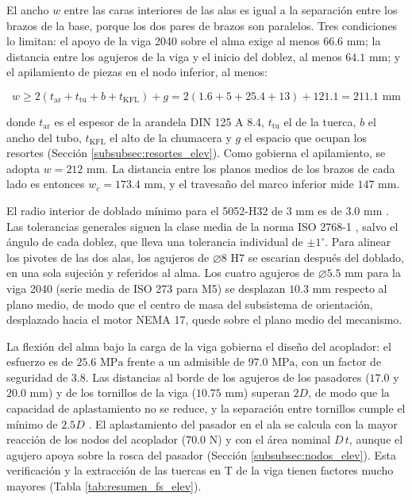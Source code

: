 \documentclass[../../General.tex]{subfiles}
\begin{document}
El ancho $w$ entre las caras interiores de las alas es igual a la separación entre los brazos de la base, porque los dos pares de brazos son paralelos. Tres condiciones lo limitan: el apoyo de la viga 2040 sobre el alma exige al menos $66.6\text{ mm}$; la distancia entre los agujeros de la viga y el inicio del doblez, al menos $64.1\text{ mm}$; y el apilamiento de piezas en el nodo inferior, al menos:

\begin{equation}\label{eq:w_elev}
    w \geq 2\left(t_{\text{ar}} + t_{\text{tu}} + b + t_{\text{KFL}}\right) + g = 2\left(1.6 + 5 + 25.4 + 13\right) + 121.1 = 211.1\text{ mm}
\end{equation}

donde $t_{\text{ar}}$ es el espesor de la arandela DIN 125 A 8.4, $t_{\text{tu}}$ el de la tuerca, $b$ el ancho del tubo, $t_{\text{KFL}}$ el alto de la chumacera y $g$ el espacio que ocupan los resortes (Sección \ref{subsubsec:resortes_elev}). Como gobierna el apilamiento, se adopta $w = 212\text{ mm}$. La distancia entre los planos medios de los brazos de cada lado es entonces $w_c = 173.4\text{ mm}$, y el travesaño del marco inferior mide $147\text{ mm}$.

El radio interior de doblado mínimo para el 5052-H32 de $3\text{ mm}$ es de $3.0\text{ mm}$ \citep{astm_b209m}. Las tolerancias generales siguen la clase media de la norma ISO 2768-1 \citep{iso2768_1}, salvo el ángulo de cada doblez, que lleva una tolerancia individual de $\pm 1^\circ$. Para alinear los pivotes de las dos alas, los agujeros de $\varnothing 8\text{ H7}$ se escarian después del doblado, en una sola sujeción y referidos al alma. Los cuatro agujeros de $\varnothing 5.5\text{ mm}$ para la viga 2040 (serie media de ISO 273 \citep{iso273} para M5) se desplazan $10.3\text{ mm}$ respecto al plano medio, de modo que el centro de masa del subsistema de orientación, desplazado hacia el motor NEMA 17, quede sobre el plano medio del mecanismo.

La flexión del alma bajo la carga de la viga gobierna el diseño del acoplador: el esfuerzo es de $25.6\text{ MPa}$ frente a un admisible de $97.0\text{ MPa}$, con un factor de seguridad de $3.8$. Las distancias al borde de los agujeros de los pasadores ($17.0$ y $20.0\text{ mm}$) y de los tornillos de la viga ($10.75\text{ mm}$) superan $2D$, de modo que la capacidad de aplastamiento no se reduce, y la separación entre tornillos cumple el mínimo de $2.5D$ \citep{aluminum2005manual}. El aplastamiento del pasador en el ala se calcula con la mayor reacción de los nodos del acoplador ($70.0\text{ N}$) y con el área nominal $D\,t$, aunque el agujero apoya sobre la rosca del pasador (Sección \ref{subsubsec:nodos_elev}). Esta verificación y la extracción de las tuercas en T de la viga tienen factores mucho mayores (Tabla \ref{tab:resumen_fs_elev}).
\end{document}
